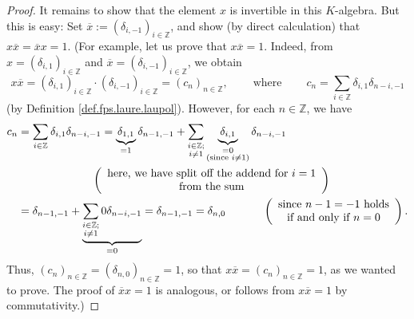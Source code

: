 \begin{fineprint}
\begin{proof}
It remains to show that the element $x$ is invertible in this $K$-algebra. But
this is easy: Set $\overline{x}:=\left(  \delta_{i,-1}\right)  _{i\in
\mathbb{Z}}$, and show (by direct calculation) that $x\overline{x}%
=\overline{x}x=1$. (For example, let us prove that $x\overline{x}=1$. Indeed,
from $x=\left(  \delta_{i,1}\right)  _{i\in\mathbb{Z}}$ and $\overline
{x}=\left(  \delta_{i,-1}\right)  _{i\in\mathbb{Z}}$, we obtain%
\[
x\overline{x}=\left(  \delta_{i,1}\right)  _{i\in\mathbb{Z}}\cdot\left(
\delta_{i,-1}\right)  _{i\in\mathbb{Z}}=\left(  c_{n}\right)  _{n\in
\mathbb{Z}},\ \ \ \ \ \ \ \ \ \ \text{where}\ \ \ \ \ \ \ \ \ \ c_{n}%
=\sum_{i\in\mathbb{Z}}\delta_{i,1}\delta_{n-i,-1}%
\]
(by Definition \ref{def.fps.laure.laupol}). However, for each $n\in\mathbb{Z}%
$, we have%
\begin{align*}
c_{n}  &  =\sum_{i\in\mathbb{Z}}\delta_{i,1}\delta_{n-i,-1}=\underbrace{\delta
_{1,1}}_{=1}\delta_{n-1,-1}+\sum_{\substack{i\in\mathbb{Z};\\i\neq
1}}\underbrace{\delta_{i,1}}_{\substack{=0\\\text{(since }i\neq1\text{)}%
}}\delta_{n-i,-1}\\
&  \ \ \ \ \ \ \ \ \ \ \ \ \ \ \ \ \ \ \ \ \left(
\begin{array}
[c]{c}%
\text{here, we have split off the addend for }i=1\\
\text{from the sum}%
\end{array}
\right) \\
&  =\delta_{n-1,-1}+\underbrace{\sum_{\substack{i\in\mathbb{Z};\\i\neq
1}}0\delta_{n-i,-1}}_{=0}=\delta_{n-1,-1}=\delta_{n,0}%
\ \ \ \ \ \ \ \ \ \ \left(
\begin{array}
[c]{c}%
\text{since }n-1=-1\text{ holds}\\
\text{if and only if }n=0
\end{array}
\right)  .
\end{align*}
Thus, $\left(  c_{n}\right)  _{n\in\mathbb{Z}}=\left(  \delta_{n,0}\right)
_{n\in\mathbb{Z}}=1$, so that $x\overline{x}=\left(  c_{n}\right)
_{n\in\mathbb{Z}}=1$, as we wanted to prove. The proof of $\overline{x}x=1$ is
analogous, or follows from $x\overline{x}=1$ by commutativity.)
\end{proof}
\end{fineprint}

